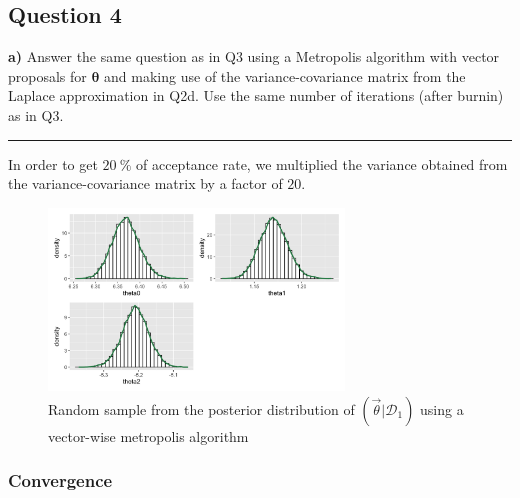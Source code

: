 \subsection*{Question 4}

\textbf{a)} Answer the same question as in Q3 using a Metropolis algorithm with vector proposals for $\bm{\theta}$ and making use of the variance-covariance matrix from the Laplace approximation in Q2d. Use the same number of iterations (after burnin) as in Q3.

\begin{center}\rule{6cm}{0.4pt}\end{center}

In order to get $\SI{20}{\percent}$ of acceptance rate, we multiplied the variance obtained from the variance-covariance matrix by a factor of $20$.

\begin{figure}[H]
	\centering
	\includegraphics[width=0.7\textwidth]{figures/metropolis_vw_samples.png}
	\caption{Random sample from the posterior distribution of $(\vec{\theta}|\mathcal{D}_1)$ using a vector-wise metropolis algorithm}
	\label{fig:metropolis_vw_samples}
\end{figure}

\subsubsection*{Convergence}

